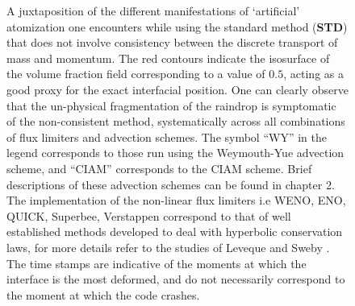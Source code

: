 \begin{figure}
\begin{center}
\end{center}
\vspace*{-0.5cm}
\caption{A juxtaposition of the different manifestations of  
`artificial' atomization one encounters while using the standard 
method (\textbf{STD}) that does not involve consistency between the discrete transport of mass and momentum. 
The red contours indicate the isosurface of the volume fraction 
field corresponding to a value of $0.5$, acting as a good proxy for the exact interfacial position. 
One can clearly observe that the un-physical fragmentation of the raindrop is symptomatic 
of the non-consistent method, systematically across all combinations of flux limiters and advection schemes. 
The symbol ``WY'' in the legend corresponds to those run using 
the Weymouth-Yue advection scheme, and ``CIAM'' corresponds to the CIAM scheme. 
Brief descriptions of these advection schemes can be found in chapter 2.
The implementation of the non-linear flux limiters i.e WENO, ENO, QUICK, Superbee, Verstappen 
correspond to that of well established methods developed to 
deal with hyperbolic conservation laws, for more details refer to the
studies of Leveque \cite{flim_1} and Sweby \cite{flim_2}.
The time stamps are indicative of the moments at which the interface
is the most deformed, and do not necessarily correspond to the moment
at which the code crashes.} 
\label{explode_all}
\end{figure}

